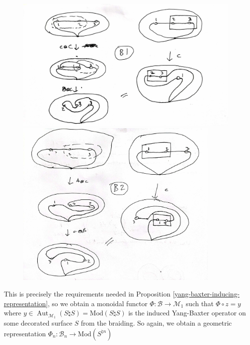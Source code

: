 \documentclass[reqno]{amsart}
\theoremstyle{definition}
\theoremstyle{remark}
\DeclareMathOperator{\Aut}{Aut}
\newcommand{\Mod}{{\mathrm{Mod}}}
\begin{document}
   \begin{figure}[H]
    \centering
    \begin{minipage}[b]{0.7\textwidth}
        \centering
        \includegraphics[width=1.1\textwidth]{B1.jpg} %
    \end{minipage}\hfill
    \begin{minipage}[b]{0.7\textwidth}
        \centering
        \includegraphics[width=0.9\textwidth]{B2.jpg} %
    \end{minipage}
\end{figure}

This is precisely the requirements needed in
Proposition \ref{yang-baxter-inducing-representation}, so
we obtain a monoidal functor
$\Phi \colon \mathcal{B} \to \mathcal{M}_1$ 
such that $\Phi \circ z = y$ where
$y \in \Aut_{\mathcal{M}_1}
\left( S \natural S \right)
= \Mod \left( S \natural S \right) $
is the induced Yang-Baxter operator
on some decorated surface $S$ from the braiding.
So again, we obtain
a geometric representation
$\Phi_{n} \colon \mathcal{B}_n \to 
\Mod \left( S^{\natural n} \right) $\\
\linebreak
\end{document}
